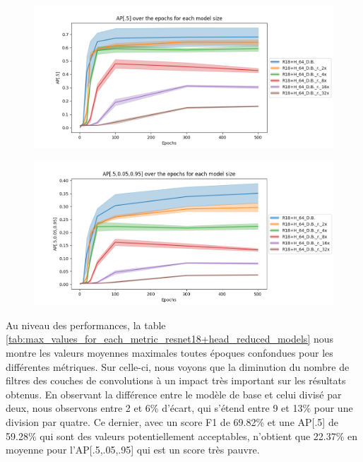 \begin{figure}[!htbp]
    \centering
    \begin{minipage}[t]{.5\textwidth}%
      \centering
      \includegraphics[width=1\linewidth]{Figures/results/resnet18+head/r18+h_ap05_over_epochs_reduced_models.png}
      \label{fig:resnet18+head_ap05_reduced}
    \end{minipage}%
    \begin{minipage}[t]{.5\textwidth}%
      \centering
      \includegraphics[width=1\linewidth ]{Figures/results/resnet18+head/r18+h_ap05_095_over_epochs_reduced_models.png}
      \label{fig:resnet18+head_ap05_095_reduced}
    \end{minipage}
\end{figure}

\break

Au niveau des performances, la table \ref{tab:max_values_for_each_metric_resnet18+head_reduced_models} nous montre les valeurs moyennes maximales toutes époques confondues pour les différentes métriques. Sur celle-ci, nous voyons que la diminution du nombre de filtres des couches de convolutions à un impact très important sur les résultats obtenus. En observant la différence entre le modèle de base et celui divisé par deux, nous observons entre 2 et 6\% d'écart, qui s'étend entre 9 et 13\% pour une division par quatre. Ce dernier, avec un score F1 de 69.82\% et une AP[.5] de 59.28\% qui sont des valeurs potentiellement acceptables, n'obtient que 22.37\% en moyenne pour l'AP[.5,.05,.95] qui est un score très pauvre.


